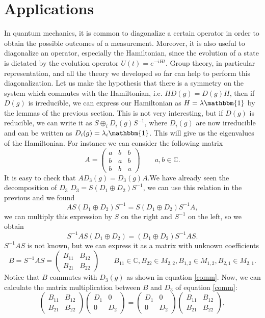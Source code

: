 \documentclass[12pt]{book}
\theoremstyle{plain}
\newcommand{\I}{\mathbbm{1}}
\newcommand{\C}{\mathbb{C}}
\theoremstyle{definition}
\theoremstyle{remark}
\begin{document}
\section{Applications}
In quantum mechanics, it is common to diagonalize a certain operator in order to obtain the possible outcomes of a measurement. Moreover, it is also useful to diagonalize an operator, especially the Hamiltonian, since the evolution of a state is dictated by the evolution operator $U(t) = e^{-iHt}$. Group theory, in particular representation, and all the theory we developed so far can help to perform this diagonalization. Let us make the hypothesis that there is a symmetry on the system which commutes with the Hamiltonian, i.e. $H D(g) = D(g)H$, then if $D(g)$ is irreducible, we can express our Hamiltonian as $H = \lambda\I$ by the lemmas of the previous section. This is not very interesting, but if $D(g)$ is reducible, we can write it as $S \oplus_i D_i(g)S^{-1}$, where $D_i(g)$ are now irreducible and can be written as $D_i(g) = \lambda_i \I$. This will give us the eigenvalues of the Hamiltonian. For instance we can consider the following matrix
\[A = \begin{pmatrix}
a&b&b\\b&a&b\\b&b&a
\end{pmatrix}\qquad a,b\in \C.\]
It is easy to check that $AD_3(g) = D_3(g)A$.We have already seen the decomposition of $D_3$ $D_3 = S(D_1\oplus D_2)S^{-1}$, we can use this relation in the previous and we found
\[AS(D_1\oplus D_2)S^{-1} = S(D_1\oplus D_2)S^{-1}A,\]
we can multiply this expression by $S$ on the right and $S^{-1}$ on the left, so we obtain
\begin{equation}\label{comm}S^{-1}AS(D_1\oplus D_2) = (D_1\oplus D_2)S^{-1}AS.\end{equation}
$S^{-1}AS$ is not known, but we can express it as a matrix with unknown coefficients
\[B = S^{-1}AS = \begin{pmatrix}
B_{11}&B_{12}\\
B_{21}&B_{22}
\end{pmatrix}\qquad B_{11}\in\C,B_{22}\in M_{2,2},B_{1,2}\in M_{1,2},B_{2,1}\in M_{2,1}.\]
Notice that $B$ commutes with $D_3(g)$ as shown in equation \eqref{comm}. Now, we can calculate the matrix multiplication between $B$ and $D_3$ of equation \eqref{comm}:
\[\begin{pmatrix}
B_{11}&B_{12}\\
B_{21}&B_{22}
\end{pmatrix} \begin{pmatrix}
D_1&0\\
0&D_2
\end{pmatrix} = \begin{pmatrix}
D_1&0\\
0&D_2
\end{pmatrix} \begin{pmatrix}
B_{11}&B_{12}\\
B_{21}&B_{22}
\end{pmatrix},\]
\end{document}
